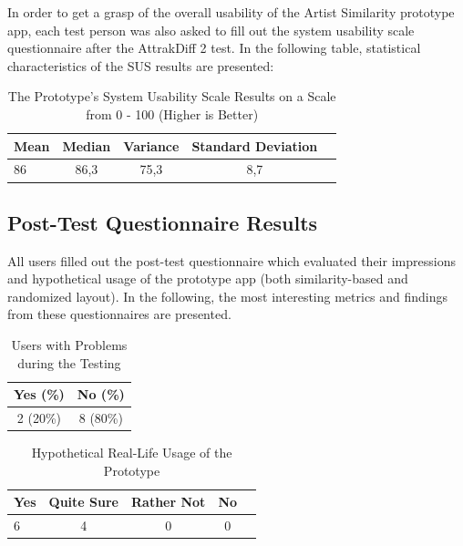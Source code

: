 In order to get a grasp of the overall usability of the Artist Similarity prototype app, each test person was also asked to fill out the system usability scale questionnaire after the AttrakDiff 2 test. In the following table, statistical characteristics of the SUS results are presented:

\begin{table}[H]
\begin{center}
\begin{tabular}{ | l | c | c | c | c |}
	\hline
	\textbf{Mean} & \textbf{Median} & \textbf{Variance} & \textbf{Standard Deviation}\\ \hline
	86 & 86,3 & 75,3 & 8,7 \\ \hline
\end{tabular}
\caption {The Prototype's System Usability Scale Results on a Scale from 0 - 100 (Higher is Better)} \label{tab:sus} 
\end{center}
\end{table}

\subsection{Post-Test Questionnaire Results}

All users filled out the post-test questionnaire which evaluated their impressions and hypothetical usage of the prototype app (both similarity-based and randomized layout). In the following, the most interesting metrics and findings from these questionnaires are presented.

\begin{table}[H]
\begin{center}
\begin{tabular}{ | c | c | }
	\hline
	\textbf{Yes (\%)} & \textbf{No (\%)} \\ \hline
	2 (20\%) & 8 (80\%) \\ \hline
\end{tabular}
\caption {Users with Problems during the Testing} \label{tab:problems-during-testing} 
\end{center}
\end{table}

\begin{table}[H]
\begin{center}
\begin{tabular}{ | l | c | c | c | c |}
	\hline
	\textbf{Yes} & \textbf{Quite Sure} & \textbf{Rather Not} & \textbf{No}\\ \hline
	6 & 4 & 0 & 0 \\ \hline
\end{tabular}
\caption {Hypothetical Real-Life Usage of the Prototype} \label{tab:hypothetical-prototype-usage} 
\end{center}
\end{table}

